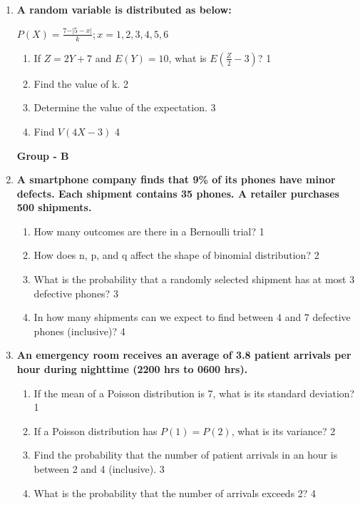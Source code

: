 \documentclass{article}
\begin{document}
\begin{enumerate}
  \item \textbf{A random variable is distributed as below:}

\begin{center}
  \textbf{$P(X) = \frac{7-\vert 5-x\vert}{k}; x=1,2,3,4,5,6$}
\end{center}

\begin{enumerate}
\item If $Z = 2Y + 7$ and $E(Y) = 10$, what is $E\left(\frac{Z}{2} - 3\right)$? \hfill 1
  \item
  	Find the value of k. \hfill 2
  \item
  	Determine the value of the expectation. \hfill 3
  \item
  	Find $V(4X-3)$ \hfill 4
\end{enumerate}


\begin{center}
\textbf{Group  - B}
\end{center}

\item  
  \textbf{A smartphone company finds that 9\% of its phones have minor defects. Each shipment contains 35 phones. A retailer purchases 500 shipments.}  

  \begin{enumerate}  
    \item How many outcomes are there in a Bernoulli trial?  \hfill 1
     \item How does n, p, and q affect the shape of binomial distribution? \hfill 2
    \item  
      What is the probability that a randomly selected shipment has at most 3 defective phones? \hfill 3  
    \item  
      In how many shipments can we expect to find between 4 and 7 defective phones (inclusive)? \hfill 4
  \end{enumerate}  

\item  
  \textbf{An emergency room receives an average of 3.8 patient arrivals per hour during nighttime (2200 hrs to 0600 hrs).}  

  \begin{enumerate}  
  \item If the mean of a Poisson distribution is 7, what is its standard deviation? \hfill 1
  \item If a Poisson distribution has \( P(1) = P(2) \), what is its variance? \hfill 2
    \item  
      Find the probability that the number of patient arrivals in an hour is between 2 and 4 (inclusive). \hfill 3  
    \item  
      What is the probability that the number of arrivals exceeds 2? \hfill 4  
  \end{enumerate}  


\end{enumerate}
\end{document}
